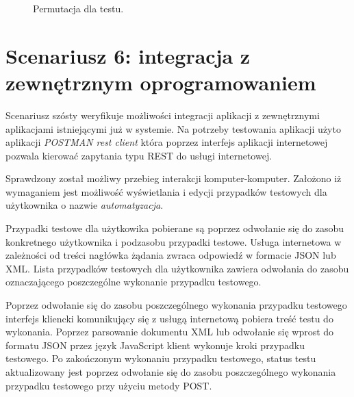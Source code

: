 \begin{figure}[h]
%
\caption{Permutacja dla testu.}
\label{fig:permutacje}
\end{figure}

\section{Scenariusz 6: integracja z zewnętrznym oprogramowaniem}

Scenariusz szósty weryfikuje możliwości integracji aplikacji z zewnętrznymi aplikacjami istniejącymi już w systemie. Na potrzeby testowania aplikacji użyto aplikacji \textit{POSTMAN rest client}\cite{postman} która poprzez interfejs aplikacji internetowej pozwala kierować zapytania typu REST do usługi internetowej.

Sprawdzony został możliwy przebieg interakcji komputer-komputer. Założono iż wymaganiem jest możliwość wyświetlania i edycji przypadków testowych dla użytkownika o nazwie \textit{automatyzacja}.

Przypadki testowe dla użytkowika pobierane są poprzez odwołanie się do zasobu konkretnego użytkownika i podzasobu przypadki testowe. Usługa internetowa w zależności od treści nagłówka żądania zwraca odpowiedź w formacie JSON lub XML. Lista przypadków testowych dla użytkownika zawiera odwołania do zasobu oznaczającego poszczególne wykonanie przypadku testowego.

Poprzez odwołanie się do zasobu poszczególnego wykonania przypadku testowego interfejs kliencki komunikujący się z usługą internetową pobiera treść testu do wykonania. Poprzez parsowanie dokumentu XML lub odwołanie się wprost do formatu JSON przez język JavaScript klient wykonuje kroki przypadku testowego. Po zakończonym wykonaniu przypadku testowego, status testu aktualizowany jest poprzez odwołanie się do zasobu poszczególnego wykonania przypadku testowego przy użyciu metody POST.


